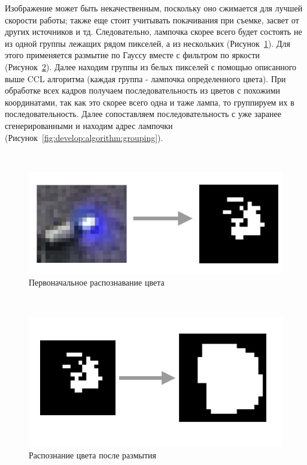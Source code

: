Изображение может быть некачественным, поскольку оно сжимается для лучшей скорости работы; также еще стоит учитывать покачивания при съемке, засвет от других источников и тд. Следовательно, лампочка скорее всего будет состоять не из одной группы лежащих рядом пикселей, а из нескольких (Рисунок~\ref{fig:develop:algorithm:toBlackWhite}). Для этого применяется размытие по Гауссу вместе с фильтром по яркости (Рисунок~\ref{fig:develop:algorithm:blurring}). Далее находим группы из белых пикселей с помощью описанного выше CCL алгоритма (каждая группа - лампочка определенного цвета). При обработке всех кадров получаем последовательность из цветов с похожими координатами, так как это скорее всего одна и таже лампа, то группируем их в последовательность. Далее сопоставляем последовательность с уже заранее сгенерированными и находим адрес лампочки (Рисунок~\ref{fig:develop:algorithm:grouping}).

~
\begin{figure}[H]
\centering
	\includegraphics[scale=0.5]{figures/calibration_toBlackWhite.jpg}
	\caption{Первоначальное распознавание цвета}
	\label{fig:develop:algorithm:toBlackWhite}
\end{figure}

~
\begin{figure}[H]
\centering
	\includegraphics[scale=0.5]{figures/calibration_blurring.jpg}
	\caption{Распознание цвета после размытия}
	\label{fig:develop:algorithm:blurring}
\end{figure}

